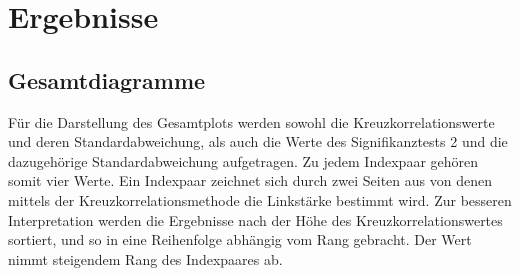 \documentclass[fontsize=11pt, twoside, a4paper]{scrartcl}
\begin{document}
\section{Ergebnisse}
\subsection{Gesamtdiagramme}
\label{sec:St2}
Für die Darstellung des Gesamtplots werden sowohl die Kreuzkorrelationswerte und deren Standardabweichung, als auch die Werte des Signifikanztests 2 und die dazugehörige Standardabweichung aufgetragen. Zu jedem Indexpaar gehören somit vier Werte. Ein Indexpaar zeichnet sich durch zwei Seiten aus von denen mittels der Kreuzkorrelationsmethode die Linkstärke bestimmt wird. Zur besseren Interpretation werden die Ergebnisse nach der Höhe des Kreuzkorrelationswertes sortiert, und so in eine Reihenfolge abhängig vom Rang gebracht. Der Wert nimmt steigendem Rang des Indexpaares ab.
\end{document}
